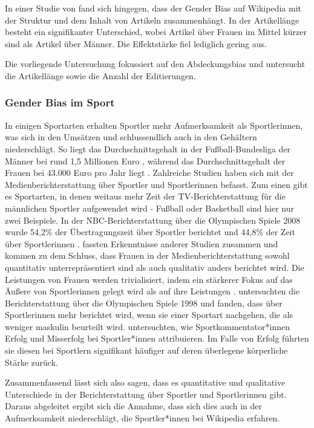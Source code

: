 \documentclass[11pt]{article}
\begin{document}
In einer Studie von  \textcite{GraellsGarrido2015} fand sich hingegen, dass der Gender Bias auf Wikipedia mit der Struktur und dem Inhalt von Artikeln zusammenhängt. In der Artikellänge besteht ein signifikanter Unterschied, wobei Artikel über Frauen im Mittel kürzer sind als Artikel über Männer. Die Effektstärke fiel lediglich gering aus.

Die vorliegende Untersuchung fokussiert auf den Abdeckungsbias und untersucht die Artikellänge sowie die Anzahl der Editierungen.

\subsubsection{Gender Bias im Sport}

In einigen Sportarten erhalten Sportler mehr Aufmerksamkeit als Sportlerinnen, was sich in den Umsätzen und schlussendlich auch in den Gehältern niederschlägt. So liegt das Durchschnittsgehalt in der Fußball-Bundesliga der Männer bei rund 1,5 Millionen Euro \parencite{Harris2015}, während das Durchschnittsgehalt der Frauen bei 43.000 Euro pro Jahr liegt \parencite{soccerIncomeWomen}. Zahlreiche Studien haben sich mit der Medienberichterstattung über Sportler und Sportlerinnen befasst. Zum einen gibt es Sportarten, in denen weitaus mehr Zeit der TV-Berichterstattung für die männlichen Sportler aufgewendet wird - Fußball oder Basketball sind hier nur zwei Beispiele. In der NBC-Berichterstattung über die Olympischen Spiele 2008 wurde 54,2\% der Übertragungszeit über Sportler berichtet und 44,8\% der Zeit über Sportlerinnen \parencite{Billings2008}. \textcite{Trolan2013} fassten Erkenntnisse anderer Studien zusammen und kommen zu dem Schluss, dass Frauen in der Medienberichterstattung sowohl quantitativ unterrepräsentiert sind als auch qualitativ anders berichtet wird. Die Leistungen von Frauen werden trivialisiert, indem ein stärkerer Fokus auf das Äußere von Sportlerinnen gelegt wird als auf ihre Leistungen \parencite{Harris2005,Vincent2004}. \textcite{Jones1999} untersuchten die Berichterstattung über die Olympischen Spiele 1998 und fanden, dass über Sportlerinnen mehr berichtet wird, wenn sie einer Sportart nachgehen, die als weniger maskulin beurteilt wird. \textcite{Billings2008} untersuchten, wie Sportkommentator*innen Erfolg und Misserfolg bei Sportler*innen attribuieren. Im Falle von Erfolg führten sie diesen bei Sportlern signifikant häufiger auf deren überlegene körperliche Stärke zurück.

Zusammenfassend lässt sich also sagen, dass es quantitative und qualitative Unterschiede in der Berichterstattung über Sportler und Sportlerinnen gibt. Daraus abgeleitet ergibt sich die Annahme, dass sich dies auch in der Aufmerksamkeit niederschlägt, die Sportler*innen bei Wikipedia erfahren.
\end{document}

